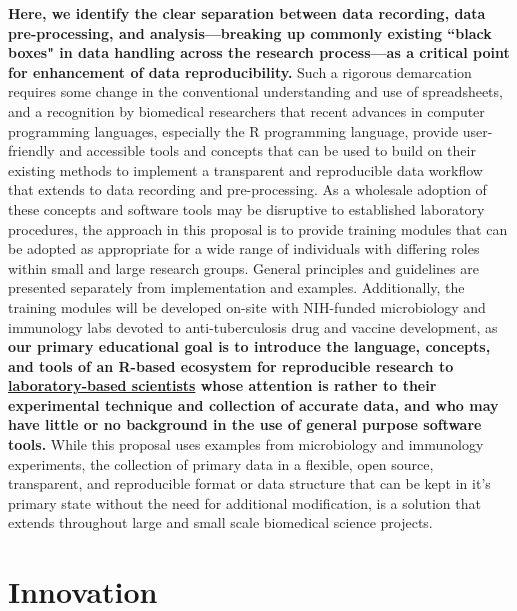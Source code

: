 \documentclass[pdftex,english,11pt,parskip=half]{scrartcl}
\begin{document}
\textbf{Here, we identify the clear separation between data recording, data pre-processing, and
analysis---breaking up commonly existing ``black boxes" in data handling across the research process---as a critical point for enhancement of data reproducibility.} Such a rigorous demarcation 
requires some change in the conventional understanding and use of spreadsheets, and a recognition by 
biomedical researchers that recent advances in computer programming languages, especially the 
R programming language, provide user-friendly and accessible tools and concepts that can be 
used to build on their existing methods to implement a transparent and reproducible data workflow that extends to data recording and pre-processing. 
As a wholesale adoption of these concepts and software tools may be disruptive to established 
laboratory procedures, the 
approach in this proposal is to provide training modules that can be adopted as appropriate 
for a wide range of individuals with differing roles within small and large research groups.  
General principles and guidelines are presented separately from implementation and examples. 
Additionally, the training modules will be developed on-site with NIH-funded microbiology
and immunology labs devoted to anti-tuberculosis drug and vaccine development, as 
\textbf{our primary educational goal is to introduce the language, concepts, and tools of an R-based 
ecosystem for reproducible research to \underline{laboratory-based scientists} whose attention is rather to 
their experimental technique and collection of accurate data, and who may have little or no background 
in the use of general purpose software tools.} While this proposal uses examples from microbiology 
and immunology experiments, the collection of primary data in a flexible, open source, 
transparent, and reproducible format or data structure that can be kept in it's primary state 
without the need for additional modification, is a solution that extends throughout large and 
small scale biomedical science projects. 

\section{Innovation} \vspace{-0.1in}
\end{document}

